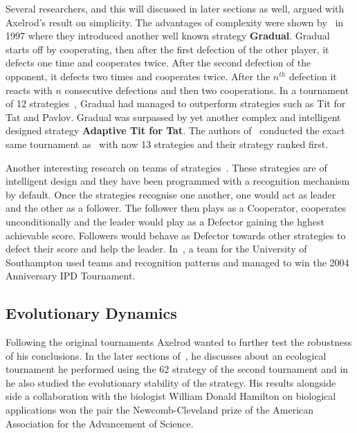 \documentclass{article}
\theoremstyle{definition}
\begin{document}
Several researchers, and this will discussed in later sections as well, argued
with Axelrod's result on simplicity. The advantages of complexity were shown
by~\cite{Beaufils1997} in 1997 where they introduced another well known strategy
\textbf{Gradual}. Gradual starts off by cooperating,
then after the first defection of the other player, it defects one time and cooperates
twice. After the second defection of the opponent, it defects two times and cooperates
twice. After the \(n^{th}\) defection it reacts with \(n\) consecutive defections 
and then two cooperations. In a tournament of 12 strategies~\cite{Beaufils1997},
Gradual had managed to outperform strategies such as Tit for Tat and Pavlov.
Gradual was surpassed by yet another complex and intelligent designed strategy
\textbf{Adaptive Tit for Tat}. The authors of~\cite{tzafestas-2000a} conducted
the exact same tournament as~\cite{Beaufils1997} with now 13 strategies and their
strategy ranked first.

Another interesting research on teams of strategies~\cite{J.P.Delahaye1993Lp,
J.P.Delahaye1995LIeP, A.Rogers2007Ctpw}. These strategies are of
intelligent design and they have been programmed with a recognition mechanism
by default. Once the strategies recognise one another, one would act as leader
and the other as a follower. The follower then plays as a Cooperator, cooperates
unconditionally and the leader would play as a Defector gaining the hghest achievable
score. Followers would behave as Defector towards other strategies to defect
their score and help the leader. In~\cite{A.Rogers2007Ctpw}, a team for the University
of Southampton used teams and recognition patterns and managed to win the 2004
Anniversary IPD Tournament.


\subsection{Evolutionary Dynamics}\label{subsection:evolutionary_dynamics}

Following the original tournaments Axelrod wanted to further test the robustness
of his conclusions. In the later sections of~\cite{Axelrod1980b}, he discusses about
an ecological tournament he performed using the 62 strategy of the second tournament
and in~\cite{axelrod1981} he also studied the evolutionary stability of the strategy.
His results alongside side a collaboration with the biologist William Donald Hamilton
on biological applications won the pair the Newcomb-Cleveland prize
of the American Association for the Advancement of Science.
\end{document}
